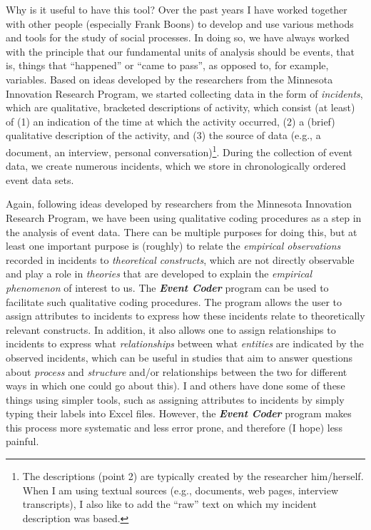 \documentclass{memoir}
\begin{document}
Why is it useful to have this tool? Over the past years I have worked together with other people (especially Frank Boons) to develop and use various methods and tools for the study of social processes. In doing so, we have always worked with the principle that our fundamental units of analysis should be events, that is, things that ``happened'' or ``came to pass'', as opposed to, for example, variables. Based on ideas developed by the researchers from the Minnesota Innovation Research Program, we started collecting data in the form of \emph{incidents}, which are qualitative, bracketed descriptions of activity, which consist (at least) of (1) an indication of the time at which the activity occurred, (2) a (brief) qualitative description of the activity, and (3) the source of data (e.g., a document, an interview, personal conversation)\footnote{The descriptions (point 2) are typically created by the researcher him/herself. When I am using textual sources (e.g., documents, web pages, interview transcripts), I also like to add the ``raw'' text on which my incident description was based.}. During the collection of event data, we create numerous incidents, which we store in chronologically ordered event data sets.

Again, following ideas developed by researchers from the Minnesota Innovation Research Program, we have been using qualitative coding procedures as a step in the analysis of event data. There can be multiple purposes for doing this, but at least one important purpose is (roughly) to relate the \emph{empirical observations} recorded in incidents to \emph{theoretical constructs}, which are not directly observable and  play a role in \emph{theories} that are developed to explain the \emph{empirical phenomenon} of interest to us. The \textbf{\emph{Event Coder}} program can be used to facilitate such qualitative coding procedures. The program allows the user to assign attributes to incidents to express how these incidents relate to theoretically relevant constructs. In addition, it also allows one to assign relationships to incidents to express what \emph{relationships} between what \emph{entities} are indicated by the observed incidents, which can be useful in studies that aim to answer questions about \emph{process} and \emph{structure} and/or relationships between the two for different ways in which one could go about this). I and others have done some of these things using simpler tools, such as assigning attributes to incidents by simply typing their labels into Excel files. However, the \textbf{\emph{Event Coder}} program makes this process more systematic and less error prone, and therefore (I hope) less painful.
\end{document}
